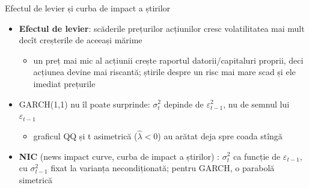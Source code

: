 \begin{frame}{Efectul de levier și curba de impact a știrilor}
\itemsize{\small}
\begin{itemize}
    \item \textbf{Efectul de levier}: scăderile prețurilor acțiunilor cresc volatilitatea mai mult decît creșterile de aceeași mărime 
    \begin{itemize}
        \item un preț mai mic al acțiunii crește raportul datorii/capitaluri proprii, deci acțiunea devine mai riscantă; știrile despre un risc mai mare scad și ele imediat prețurile
    \end{itemize}
    \item GARCH(1,1) nu îl poate surprinde: $\sigma_t^2$ depinde de $\varepsilon_{t-1}^2$, nu de semnul lui $\varepsilon_{t-1}$
    \begin{itemize}
        \item graficul QQ și t asimetrică ($\hat\lambda < 0$) au arătat deja spre coada stîngă
    \end{itemize}
    \item \textbf{NIC} (news impact curve, curba de impact a știrilor) : $\sigma_t^2$ ca funcție de $\varepsilon_{t-1}$, cu $\sigma_{t-1}^2$ fixat la varianța necondiționată; pentru GARCH, o parabolă simetrică
\end{itemize}
\end{frame}

